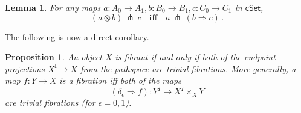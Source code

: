 \documentclass[12pt]{article}
\newcommand{\cSet}{\ensuremath{\mathsf{cSet}}}
\newcommand{\mono}{\ensuremath{\rightarrowtail}}
\newcommand{\ra}{\ensuremath{\rightarrow}}
\renewcommand{\to}{\ensuremath{\rightarrow}}
\newcommand{\I}{\ensuremath{\mathrm{I}}}
\newtheorem{proposition}[theorem]{Proposition}
\newtheorem{lemma}[theorem]{Lemma}
\theoremstyle{remark}
\theoremstyle{definition}
\begin{document}
\begin{lemma}\label{lemma:Leibniz}
For any maps $a : A_0 \to A_1, b : B_0 \to B_1, c : C_0 \to C_1$ in $\cSet$,
\[
(a\otimes b)\, \pitchfork\, c\quad\text{iff}\quad a\, \pitchfork\, (b\Rightarrow\! c)\,.
\]
\end{lemma}

The following is now a direct corollary.

\begin{proposition}\label{prop:algequivfill}
An object $X$ is fibrant if and only if both of the endpoint  projections $X^\I \ra X$ from the pathspace are trivial fibrations. More generally, a map $f : Y\ra X$ is a fibration iff both of the maps $$(\delta_\epsilon \Rightarrow f) : Y^I \ra X^I\times_X Y$$ are trivial fibrations (for $\epsilon = 0,1$).
\end{proposition}
%
\end{document}

